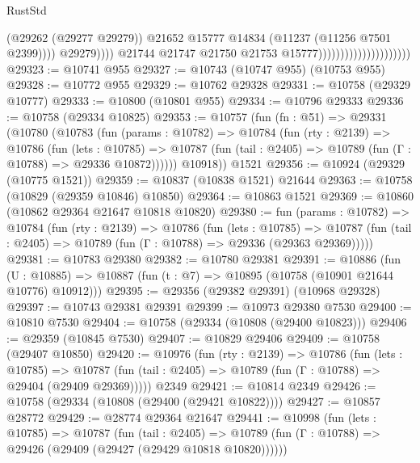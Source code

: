 \begin{lexlean}{RustStd}
\begin{coremodule}
                                                          (@29262 (@29277 @29279))
                                                          @21652
                                                          @15777
                                                          @14834
                                                          (@11237 (@11256 @7501 @2399))))
                                                      @29279))))
                                              @21744
                                              @21747
                                              @21750
                                              @21753
                                              @15777)))))))))))))))))))))
@29323 := @10741 @955
@29327 := @10743 (@10747 @955) (@10753 @955)
@29328 := @10772 @955
@29329 := @10762 @29328
@29331 := @10758 (@29329 @10777)
@29333 := @10800 (@10801 @955)
@29334 := @10796 @29333
@29336 := @10758 (@29334 @10825)
@29353 := @10757
    (fun (fn : @51) =>
    @29331
      (@10780
        (@10783
          (fun (params : @10782) =>
          @10784
            (fun (rty : @2139) =>
            @10786
              (fun (lets : @10785) =>
              @10787 (fun (tail : @2405) => @10789 (fun (Γ : @10788) => @29336 @10872))))))
        @10918))
    @1521
@29356 := @10924 (@29329 (@10775 @1521))
@29359 := @10837 (@10838 @1521) @21644
@29363 := @10758 (@10829 (@29359 @10846) @10850)
@29364 := @10863 @1521
@29369 := @10860 (@10862 @29364 @21647 @10818 @10820)
@29380 := fun (params : @10782) =>
  @10784
    (fun (rty : @2139) =>
    @10786
      (fun (lets : @10785) =>
      @10787 (fun (tail : @2405) => @10789 (fun (Γ : @10788) => @29336 (@29363 @29369)))))
@29381 := @10783 @29380
@29382 := @10780 @29381
@29391 := @10886
    (fun (U : @10885) => @10887 (fun (t : @7) => @10895 (@10758 (@10901 @21644 @10776) @10912)))
@29395 := @29356 (@29382 @29391) (@10968 @29328)
@29397 := @10743 @29381 @29391
@29399 := @10973 @29380 @7530
@29400 := @10810 @7530
@29404 := @10758 (@29334 (@10808 (@29400 @10823)))
@29406 := @29359 (@10845 @7530)
@29407 := @10829 @29406
@29409 := @10758 (@29407 @10850)
@29420 := @10976
    (fun (rty : @2139) =>
    @10786
      (fun (lets : @10785) =>
      @10787 (fun (tail : @2405) => @10789 (fun (Γ : @10788) => @29404 (@29409 @29369)))))
    @2349
@29421 := @10814 @2349
@29426 := @10758 (@29334 (@10808 (@29400 (@29421 @10822))))
@29427 := @10857 @28772
@29429 := @28774 @29364 @21647
@29441 := @10998
    (fun (lets : @10785) =>
    @10787
      (fun (tail : @2405) =>
      @10789 (fun (Γ : @10788) => @29426 (@29409 (@29427 (@29429 @10818 @10820))))))

\end{coremodule}
\end{lexlean}
